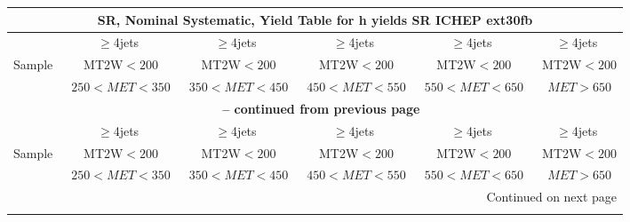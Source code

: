 \documentclass{article}
\begin{document}
\begin{longtable}{|l|c|c|c|c|c|} 
 
\multicolumn{6}{c}{ SR, Nominal Systematic, Yield Table for h yields SR ICHEP ext30fb }\\* \hline 
  & $\ge$4jets  & $\ge$4jets  & $\ge$4jets  & $\ge$4jets  & $\ge$4jets \\* 
Sample  & ~MT2W$<200$  & ~MT2W$<200$  & ~MT2W$<200$  & ~MT2W$<200$  & ~MT2W$<200$ \\* 
  & ~$250<MET<350$  & ~$350<MET<450$  & ~$450<MET<550$  & ~$550<MET<650$  & ~$MET>650$ \\* 
\hline \hline 
\endfirsthead 
 
\multicolumn{6}{c}{{\bfseries \tablename\ \thetable{} -- continued from previous page}}\\* \hline 
  & $\ge$4jets  & $\ge$4jets  & $\ge$4jets  & $\ge$4jets  & $\ge$4jets \\* 
Sample  & ~MT2W$<200$  & ~MT2W$<200$  & ~MT2W$<200$  & ~MT2W$<200$  & ~MT2W$<200$ \\* 
  & ~$250<MET<350$  & ~$350<MET<450$  & ~$450<MET<550$  & ~$550<MET<650$  & ~$MET>650$ \\* 
\hline \hline 
\endhead 
 
\multicolumn{6}{|r|}{{Continued on next page}}\\* \hline 
\endfoot 
 
 
\endlastfoot 
 

\end{longtable}
\end{document}
